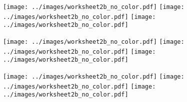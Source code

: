 \documentclass[a4paper,12pt]{article}
\begin{document}
\vspace{25pt}
\texttt{[image: ../images/worksheet2b\_no\_color.pdf]}\hfill
\texttt{[image: ../images/worksheet2b\_no\_color.pdf]}\hfill
\texttt{[image: ../images/worksheet2b\_no\_color.pdf]}

\vspace{25pt}
\texttt{[image: ../images/worksheet2b\_no\_color.pdf]}\hfill
\texttt{[image: ../images/worksheet2b\_no\_color.pdf]}\hfill
\texttt{[image: ../images/worksheet2b\_no\_color.pdf]}

\vspace{25pt}
\texttt{[image: ../images/worksheet2b\_no\_color.pdf]}\hfill
\texttt{[image: ../images/worksheet2b\_no\_color.pdf]}\hfill
\texttt{[image: ../images/worksheet2b\_no\_color.pdf]}
\end{document}
